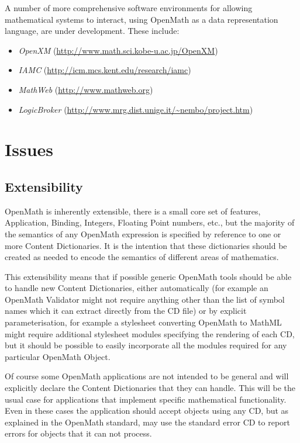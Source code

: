 \documentclass[keylogo]{openmath}
\begin{document}
A number of more comprehensive software environments for allowing
mathematical systems to interact, using OpenMath as a data
representation language, are under development.  These include:
\begin{itemize}
\item \emph{OpenXM} (\url{http://www.math.sci.kobe-u.ac.jp/OpenXM})
\item \emph{IAMC} (\url{http://icm.mcs.kent.edu/research/iamc})
\item \emph{MathWeb} (\url{http://www.mathweb.org})
\item \emph{LogicBroker} (\url{http://www.mrg.dist.unige.it/~nembo/project.htm})
\end{itemize}

\section {Issues}

\subsection{Extensibility}\label{extensibility}

OpenMath is inherently extensible, there is a small core set of
features, Application, Binding, Integers, Floating Point numbers,
etc., but the majority of the semantics of any OpenMath expression is
specified by reference to one or more Content Dictionaries. It is the
intention that these dictionaries should be created as needed to
encode the semantics of different areas of mathematics.

This extensibility means that if possible generic OpenMath tools
should be able to handle new Content Dictionaries, either
automatically (for example an OpenMath Validator might not require
anything other than the list of symbol names which it can extract
directly from the CD file) or by explicit parameterisation, for
example a stylesheet converting OpenMath to MathML might require
additional stylesheet modules specifying the rendering of each CD, but
it should be possible to easily incorporate all the modules required
for any particular OpenMath Object.

Of course some OpenMath applications are not intended to be general
and will explicitly declare the Content Dictionaries that they can
handle.  This will be the usual case for applications that implement
specific mathematical functionality. Even in these cases the
application should accept objects using any CD, but as explained in
the OpenMath standard, may use the standard error CD to report errors
for objects that it can not process.
\end{document}
